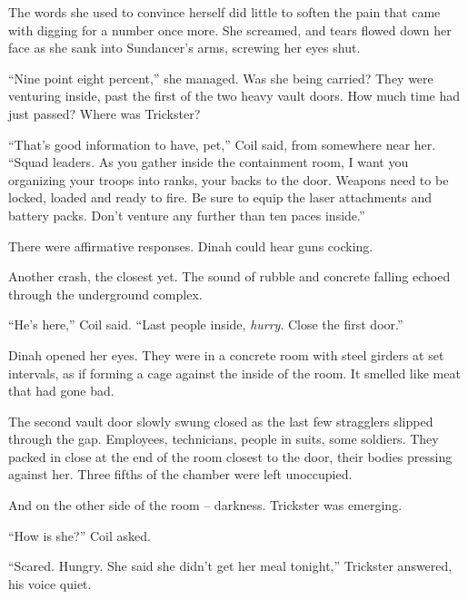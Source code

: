 The words she used to convince herself did little to soften the pain that came with digging for a number once more.  She screamed, and tears flowed down her face as she sank into Sundancer's arms, screwing her eyes shut.



``Nine point eight percent,'' she managed.  Was she being carried?  They were venturing inside, past the first of the two heavy vault doors.  How much time had just passed?  Where was Trickster?



``That's good information to have, pet,'' Coil said, from somewhere near her.  ``Squad leaders.  As you gather inside the containment room, I want you organizing your troops into ranks, your backs to the door.  Weapons need to be locked, loaded and ready to fire.  Be sure to equip the laser attachments and battery packs.  Don't venture any further than ten paces inside.''



There were affirmative responses.  Dinah could hear guns cocking.



Another crash, the closest yet.  The sound of rubble and concrete falling echoed through the underground complex.



``He's here,'' Coil said.  ``Last people inside, \emph{hurry}.  Close the first door.''



Dinah opened her eyes.  They were in a concrete room with steel girders at set intervals, as if forming a cage against the inside of the room.  It smelled like meat that had gone bad.



The second vault door slowly swung closed as the last few stragglers slipped through the gap.  Employees, technicians, people in suits, some soldiers.  They packed in close at the end of the room closest to the door, their bodies pressing against her.  Three fifths of the chamber were left unoccupied.



And on the other side of the room – darkness.  Trickster was emerging.



``How is she?''  Coil asked.



``Scared.  Hungry.  She said she didn't get her meal tonight,'' Trickster answered, his voice quiet.



